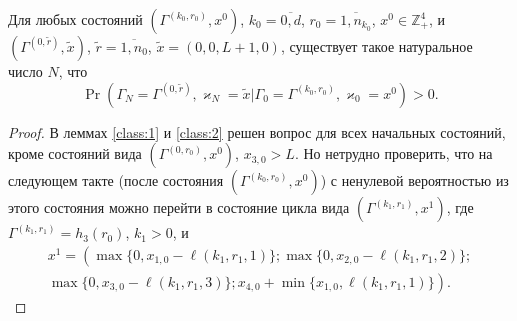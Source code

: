 \documentclass[a4paper,12pt,russian]{extarticle}
\begin{document}
\begin{lemma}\label{all:in:one}
Для любых состояний $(\Gamma^{(k_0,r_0)},x^0)$, $k_0=\overline{0,d}$, $r_0=\overline{1,n_{k_0}}$, $x^0 \in \mathbb{Z}_+^4$, и $(\Gamma^{(0,\tilde{r})},\tilde{x})$, $\tilde{r} = \overline{1,n_0}$, $\tilde{x}=(0,0,L+1,0)$, существует такое натуральное число $N$, что 
\begin{equation*}
\Pr(\Gamma_{N}=\Gamma^{(0,\tilde{r} )}, \varkappa_{N}=\tilde{x}|
\Gamma_{0}=\Gamma^{(k_0,r_0)}, \varkappa_{0}=x^0)>0.
\end{equation*}
\end{lemma}
\begin{proof}
В леммах \eqref{class:1} и \eqref{class:2} решен вопрос для всех начальных состояний, кроме состояний вида $(\Gamma^{(0,r_0)},x^0)$, $x_{3,0}>L$. Но нетрудно проверить, что на следующем такте (после состояния $(\Gamma^{(k_0,r_0)},x^0)$) с ненулевой вероятностью из этого состояния можно перейти в состояние цикла вида $(\Gamma^{(k_1,r_1)},x^1)$, где $\Gamma^{(k_1,r_1)} = h_3(r_0)$, $k_1>0$, и 
\begin{multline*}
x^{1}=\left(\max{\{0,x_{1,0} - \ell(k_1,r_1,1)\}};
\max{\{0,x_{2,0} - \ell(k_1,r_1,2)\}};\right.\\
\left.
\max{\{0,x_{3,0} - \ell(k_1,r_1,3)\}};
x_{4,0} + \min{\{x_{1,0}, \ell(k_1,r_1,1)\}}\right).
\end{multline*}



\end{proof}
\end{document}
